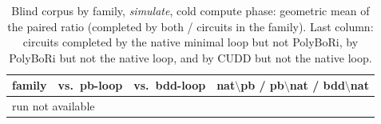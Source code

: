 \begin{table}[t]
\centering\small
\caption{Blind corpus by family, \emph{simulate}, cold compute phase: geometric mean of the paired ratio (completed by both / circuits in the family). Last column: circuits completed by the native minimal loop but not PolyBoRi, by PolyBoRi but not the native loop, and by CUDD but not the native loop.}
\label{tab:families}
\begin{tabular}{lrrr}
\toprule
family & vs.\ \textsf{pb-loop} & vs.\ \textsf{bdd-loop} & nat$\setminus$pb / pb$\setminus$nat / bdd$\setminus$nat \\
\midrule
\multicolumn{4}{l}{run not available} \\
\bottomrule
\end{tabular}
\end{table}
